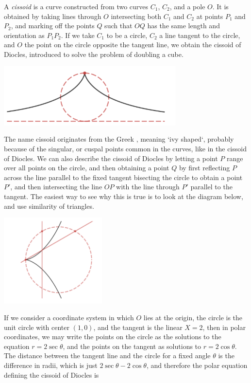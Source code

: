\begin{example}
    A \emph{cissoid} is a curve constructed from two curves $C_1$, $C_2$, and a pole $O$. It is obtained by taking lines through $O$ intersecting both $C_1$ and $C_2$ at points $P_1$ and $P_2$, and marking off the points $Q$ such that $OQ$ has the same length and orientation as $P_1P_2$. If we take $C_1$ to be a circle, $C_2$ a line tangent to the circle, and $O$ the point on the circle opposite the tangent line, we obtain the cissoid of Diocles, introduced to solve the problem of doubling a cube.
    \begin{center}
    \includegraphics[width=0.7\textwidth]{CissoidDiocles}
    \end{center}
    The name cissoid originates from the Greek \textkappa \textiota \textsigma \textsigma \textomikron \textepsilon \textiota \textdelta \texteta \textvarsigma, meaning `ivy shaped`, probably because of the singular, or cuspal points common in the curves, like in the cissoid of Diocles. We can also describe the cissoid of Diocles by letting a point $P$ range over all points on the circle, and then obtaining a point $Q$ by first reflecting $P$ across the line parallel to the fixed tangent bisecting the circle to obtain a point $P'$, and then intersecting the line $OP$ with the line through $P'$ parallel to the tangent. The easiest way to see why this is true is to look at the diagram below, and use similarity of triangles.
    \begin{center}
        \includegraphics[width=0.4\textwidth]{CissoidDiocles2}
    \end{center}
    If we consider a coordinate system in which $O$ lies at the origin, the circle is the unit circle with center $(1,0)$, and the tangent is the linear $X = 2$, then in polar coordinates, we may write the points on the circle as the solutions to the equation $r = 2 \sec \theta$, and the points on the tangent as solutions to $r = 2 \cos \theta$. The distance between the tangent line and the circle for a fixed angle $\theta$ is the difference in radii, which is just $2 \sec \theta - 2 \cos \theta$, and therefore the polar equation defining the cissoid of Diocles is

\end{example}
